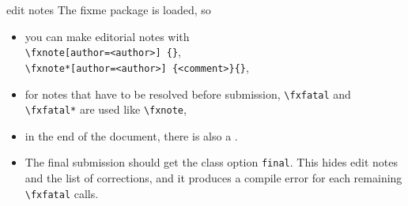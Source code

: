 \begingroup
\def\cmd#1{\texttt{\textbackslash{}#1}}
\begin{anfxwarning}[author=\noindent JR]{edit notes}
  The \textsf{fixme} package is loaded, so
  \begin{itemize}
    \item you can make editorial notes with
      \\
        \texttt{\cmd{fxnote}[author=<author>]%
      \twocol{\\\hbox{}\quad}%
          \{<margin comment>\}},
      \\
        \texttt{\cmd{fxnote*}[author=<author>]%
      \twocol{\\\hbox{}\quad}%
          \{<comment>\}\{<text to highlight>\}},

  \item
    for notes that have to be resolved before submission,
    \cmd{fxfatal} and \cmd{fxfatal*} are used like \cmd{fxnote},

  \item
    in the end of the document, there is also a \MakeLowercase\englishlistfixmename .

  \item
    The final submission should get the class option \texttt{final}. This hides
    edit notes and the list of corrections, and it produces a compile error for
    each remaining \cmd{fxfatal} calls.
\end{itemize}
\end{anfxwarning}
\endgroup

